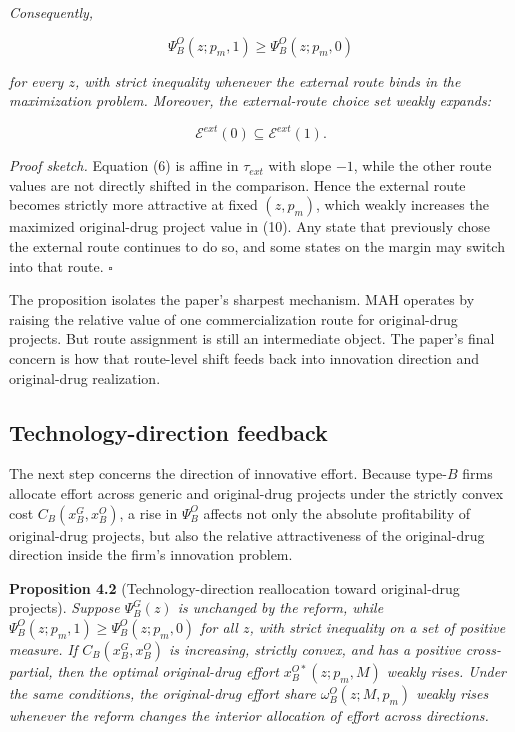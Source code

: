 \documentclass[12pt]{article}
\begin{document}
\textit{Consequently,}

\[
\Psi_B^O(z;p_m,1)\ge \Psi_B^O(z;p_m,0)
\]

\textit{for every $z$, with strict inequality whenever the external route binds in the maximization problem. Moreover, the external-route choice set weakly expands:}

\[
\mathcal{E}^{ext}(0)\subseteq \mathcal{E}^{ext}(1).
\]

\textit{Proof sketch.} Equation (6) is affine in $\tau_{ext}$ with slope $-1$, while the other route values are not directly shifted in the comparison. Hence the external route becomes strictly more attractive at fixed $(z,p_m)$, which weakly increases the maximized original-drug project value in (10). Any state that previously chose the external route continues to do so, and some states on the margin may switch into that route. \hfill$\square$

The proposition isolates the paper's sharpest mechanism. MAH operates by raising the
relative value of one commercialization route for original-drug projects. But route assignment
is still an intermediate object. The paper's final concern is how that route-level shift feeds
back into innovation direction and original-drug realization.

\subsection{Technology-direction feedback}

The next step concerns the direction of innovative effort. Because type-$B$ firms allocate effort
across generic and original-drug projects under the strictly convex cost $C_B(x_B^G,x_B^O)$, a rise
in $\Psi_B^O$ affects not only the absolute profitability of original-drug projects, but also the
relative attractiveness of the original-drug direction inside the firm's innovation problem.

\textbf{Proposition 4.2} (Technology-direction reallocation toward original-drug projects). \textit{Suppose $\Psi_B^G(z)$ is unchanged by the reform, while $\Psi_B^O(z;p_m,1)\ge \Psi_B^O(z;p_m,0)$ for all $z$, with strict inequality on a set of positive measure. If $C_B(x_B^G,x_B^O)$ is increasing, strictly convex, and has a positive cross-partial, then the optimal original-drug effort $x_B^{O*}(z;p_m,M)$ weakly rises. Under the same conditions, the original-drug effort share $\omega_B^O(z;M,p_m)$ weakly rises whenever the reform changes the interior allocation of effort across directions.}
\end{document}

